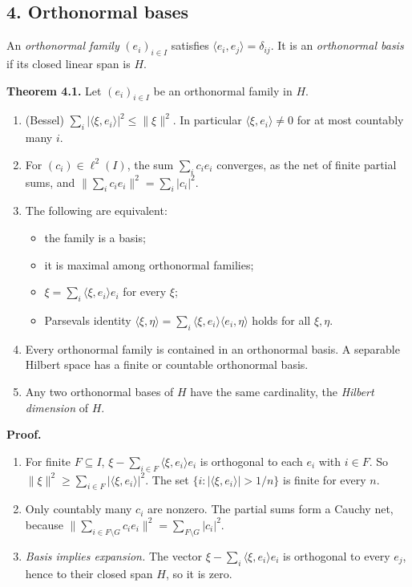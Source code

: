 \documentclass[
  english,
  11pt,
  a4paper,
]{article}
\providecommand{\tightlist}{%
  \setlength{\itemsep}{0pt}\setlength{\parskip}{0pt}}
\begin{document}
\subsection[4. Orthonormal
bases]{\texorpdfstring{\protect\hypertarget{hilbert-spaces-and-compact-operators--oa-fnd-hs-04}{}{}4.
Orthonormal
bases}{4. Orthonormal bases}}\label{hilbert-spaces-and-compact-operators--OA-FND-HS-04}

An \emph{orthonormal family} \((e_i)_{i\in I}\) satisfies
\(\langle e_i,e_j\rangle=\delta_{ij}\). It is an \emph{orthonormal
basis} if its closed linear span is \(H\).

\textbf{Theorem 4.1.} Let \((e_i)_{i\in I}\) be an orthonormal family in
\(H\).

\begin{enumerate}
\tightlist
\item
  (Bessel) \(\sum_i|\langle\xi,e_i\rangle|^2\le\|\xi\|^2\). In
  particular \(\langle\xi,e_i\rangle\ne0\) for at most countably many
  \(i\).
\item
  For \((c_i)\in\ell^2(I)\), the sum \(\sum_ic_ie_i\) converges, as the
  net of finite partial sums, and \(\|\sum_ic_ie_i\|^2=\sum_i|c_i|^2\).
\item
  The following are equivalent:

  \begin{itemize}
  \tightlist
  \item
    the family is a basis;
  \item
    it is maximal among orthonormal families;
  \item
    \(\xi=\sum_i\langle\xi,e_i\rangle e_i\) for every \(\xi\);
  \item
    Parseval\textquotesingle s identity
    \(\langle\xi,\eta\rangle=\sum_i\langle\xi,e_i\rangle\langle e_i,\eta\rangle\)
    holds for all \(\xi,\eta\).
  \end{itemize}
\item
  Every orthonormal family is contained in an orthonormal basis. A
  separable Hilbert space has a finite or countable orthonormal basis.
\item
  Any two orthonormal bases of \(H\) have the same cardinality, the
  \emph{Hilbert dimension} of \(H\).
\end{enumerate}

\textbf{Proof.}

\begin{enumerate}
\item
  For finite \(F\subseteq I\),
  \(\xi-\sum_{i\in F}\langle\xi,e_i\rangle e_i\) is orthogonal to each
  \(e_i\) with \(i\in F\). So
  \(\|\xi\|^2\ge\sum_{i\in F}|\langle\xi,e_i\rangle|^2\). The set
  \(\{i:|\langle\xi,e_i\rangle|>1/n\}\) is finite for every \(n\).
\item
  Only countably many \(c_i\) are nonzero. The partial sums form a
  Cauchy net, because
  \(\|\sum_{i\in F\setminus G}c_ie_i\|^2=\sum_{F\setminus G}|c_i|^2\).
\item
  \emph{Basis implies expansion.} The vector
  \(\xi-\sum_i\langle\xi,e_i\rangle e_i\) is orthogonal to every
  \(e_j\), hence to their closed span \(H\), so it is zero.
\end{enumerate}
\end{document}
